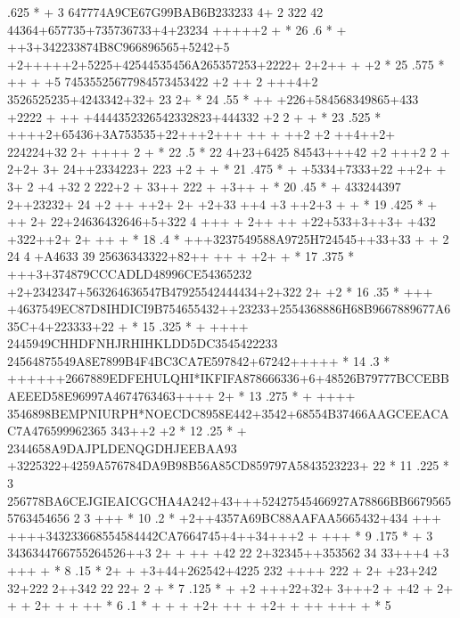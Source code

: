 \begin{minipage}[t]{.495\textwidth}
\begin{XMPfrac}{3.2}
     .625  *           +     3 647774A9CE67G99BAB6B233233 4+ 2 322 42 44364+657735+735736733+4+23234 +++++2  +    *  26
     .6    *            + ++3+342233874B8C966896565+5242+5 +2+++++2+5225+42544535456A265357253+2222+ 2+2++ +  +2  *  25
     .575  *           ++  +  +5 74535525677984573453422 +2   ++ 2  +++4+2 3526525235+4243342+32+  23 2+          *  24
     .55   *               ++ +226+584568349865+433 +2222 +      ++ +4444352326542332823+444332 +2 2 + +          *  23
     .525  *                 ++++2+65436+3A753535+22+++2+++  ++ + ++2  +2 ++4++2+ 224224+32 2+ ++++ 2      +      *  22
     .5    *                 22  4+23+6425 84543+++42 +2     +++2  2 + 2+2+ 3+ 24++2334223+ 223  +2   +       +   *  21
     .475  *         +             +5334+7333+22  ++2+ +  3+      2 +4 +32  2 222+2 + 33++ 222 +  +3++     +      *  20
     .45   *                  +  433244397 2++23232+ 24 +2        ++  ++2+ 2+ +2+33  ++4 +3 ++2+3    +  +         *  19
     .425  *           +  ++ 2+ 22+24636432646+5+322 4 +++ + 2++  ++ +22+533+3++3+  +432 +322++2+     2+  ++ +    *  18
     .4    *                +++3237549588A9725H724545++33+33 + + 2 24  4 +A4633 39 25636343322+82++ ++ + +2+  +   *  17
     .375  *              +++3+374879CCCADLD48996CE54365232 +2+2342347+563264636547B47925542444434+2+322 2+  +2   *  16
     .35   *            +++ +4637549EC87D8IHDICI9B754655432++23233+2554368886H68B9667889677A635C+4+223333+22  +   *  15
     .325  *        +  ++++ 2445949CHHDFNHJRHIHKLDD5DC3545422233 24564875549A8E7899B4F4BC3CA7E597842+67242+++++   *  14
     .3    *          ++++++2667889EDFEHULQHI*IKFIFA878666336+6+48526B79777BCCEBBAEEED58E96997A4674763463++++ 2+  *  13
     .275  *        +  ++++ 3546898BEMPNIURPH*NOECDC8958E442+3542+68554B37466AAGCEEACAC7A476599962365 343++2 +2   *  12
     .25   *        +     2344658A9DAJPLDENQGDHJEEBAA93 +3225322+4259A576784DA9B98B56A85CD859797A5843523223+ 22   *  11
     .225  *               3 256778BA6CEJGIEAICGCHA4A242+43+++52427545466927A78866BB66795655763454656  2 3 +++    *  10
     .2    *                +2++4357A69BC88AAFAA5665432+434 +++ ++++343233668554584442CA7664745+4++34+++2 + +++   *   9
     .175  *                 + 3  3436344766755264526++3 2+ + ++ +42  22 2+32345++353562 34 33+++4 +3 +++  +      *   8
     .15   *                  2+ + +3+44+262542+4225 232 ++++   222 + 2+  +23+242 32+222 2++342 22    22+ 2  +    *   7
     .125  *              +   +2  +++22+32+ 3+++2                    +  +42 +  2+ +   +  2+       + + ++          *   6
     .1    *                           +  +   + +2+     ++             +    +2+    +        ++    +++ +           *   5

\end{XMPfrac}
\end{minipage}
